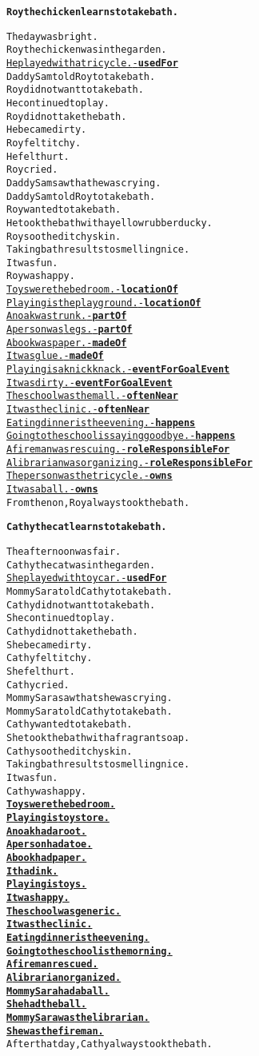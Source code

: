\begin{alltt}
\textbf{Roy the chicken learns to take bath.}

The day was bright.
Roy the chicken was in the garden.
\underline{He played with a tricycle. - \textbf{usedFor}}
Daddy Sam told Roy to take bath.
Roy did not want to take bath.
He continued to play.
Roy did not take the bath.
He became dirty.
Roy felt itchy.
He felt hurt.
Roy cried.
Daddy Sam saw that he was crying.
Daddy Sam told Roy to take bath.
Roy wanted to take bath.
He took the bath with a yellow rubber ducky.
Roy soothed itchy skin.
Taking bath results to smelling nice.
It was fun.
Roy was happy.
\underline{Toys were the bedroom. - \textbf{locationOf}}
\underline{Playing is the playground. - \textbf{locationOf}}
\underline{An oak was trunk. - \textbf{partOf}}
\underline{A person was legs. - \textbf{partOf}}
\underline{A book was paper. - \textbf{madeOf}}
\underline{It was glue. - \textbf{madeOf}}
\underline{Playing is a knick knack. - \textbf{eventForGoalEvent}}
\underline{It was dirty. - \textbf{eventForGoalEvent}}
\underline{The school was the mall. - \textbf{oftenNear}}
\underline{It was the clinic. - \textbf{oftenNear}}
\underline{Eating dinner is the evening. - \textbf{happens}}
\underline{Going to the school is saying goodbye. - \textbf{happens}}
\underline{A fireman was rescuing. - \textbf{roleResponsibleFor}}
\underline{A librarian was organizing. - \textbf{roleResponsibleFor}}
\underline{The person was the tricycle. - \textbf{owns}}
\underline{It was a ball. - \textbf{owns}}
From then on, Roy always took the bath.
\end{alltt}

\begin{alltt}
\textbf{Cathy the cat learns to take bath.}

The afternoon was fair.
Cathy the cat was in the garden.
\underline{She played with toy car. - \textbf{usedFor}}
Mommy Sara told Cathy to take bath.
Cathy did not want to take bath.
She continued to play.
Cathy did not take the bath.
She became dirty.
Cathy felt itchy.
She felt hurt.
Cathy cried.
Mommy Sara saw that she was crying.
Mommy Sara told Cathy to take bath.
Cathy wanted to take bath.
She took the bath with a fragrant soap.
Cathy soothed itchy skin.
Taking bath results to smelling nice.
It was fun.
Cathy was happy.
\underline{\textbf{Toys were the bedroom.
Playing is toy store.
An oak had a root.
A person had a toe.
A book had paper.
It had ink.
Playing is toys.
It was happy.
The school was generic.
It was the clinic.
Eating dinner is the evening.
Going to the school is the morning.
A fireman rescued.
A librarian organized.
Mommy Sara had a ball.
She had the ball.
Mommy Sara was the librarian.
She was the fireman.}}
After that day, Cathy always took the bath.
\end{alltt}


